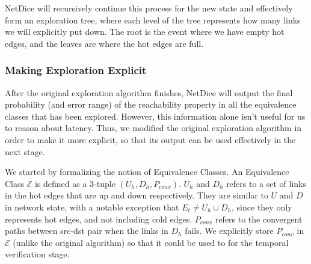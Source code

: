 \documentclass[10pt,sigconf,letterpaper,anonymous,nonacm]{acmart}
\begin{document}


NetDice will recursively continue this process for the new state and effectively form an exploration 
tree, where each level of the tree represents how many links we will explicitly put down.
The root is the event where we have empty hot edges, and the leaves are where the hot edges 
are full.

\subsubsection{Making Exploration Explicit}
After the original exploration algorithm finishes, NetDice will output the final probability (and 
error range) of the reachability property in all the equivalence classes that has been explored. 
However, this information alone isn't useful for us to reason about latency.
Thus, we modified the original exploration algorithm in order to make it more explicit, so that its 
output can be used effectively in the next stage.

We started by formalizing the notion of Equivalence Classes.
An Equivalence Class $\mathcal{E}$ is defined as a 3-tuple $(U_h, D_h, P_{conv})$.
$U_h$ and $D_h$ refers to a set of links in the hot edges that are up and down respectively.
They are similar to $U$ and $D$ in network state, with a notable exception that 
$E_t \neq U_h \cup D_h$, since they only represents hot edges, and not including cold edges.
$P_{conv}$ refers to the convergent paths between src-dst pair when the links in $D_h$ fails.
We explicitly store $P_{conv}$ in $\mathcal{E}$ (unlike the original algorithm) so that it could 
be used to for the temporal verification stage.
\end{document}
